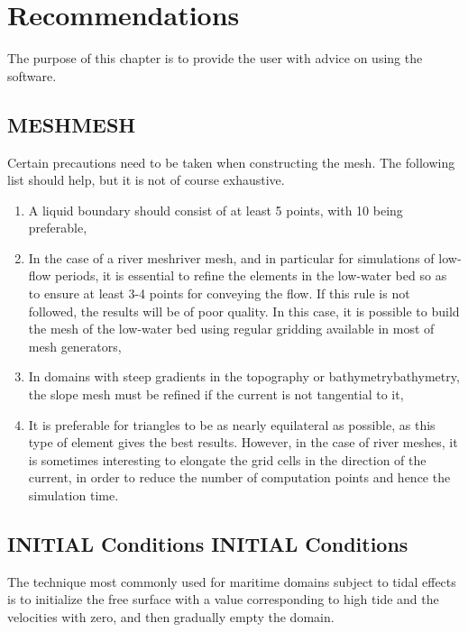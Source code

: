 \documentclass{article} %
\begin{document}
\section{  Recommendations}

 The purpose of this chapter is to provide the user with advice on using the software.


\subsection{ MESHMESH}

 Certain precautions need to be taken when constructing the mesh. The following list should help, but it is not of course exhaustive.

\begin{enumerate}
\item  A liquid boundary should consist of at least 5 points, with 10 being preferable,

\item  In the case of a river meshriver mesh, and in particular for simulations of low-flow periods, it is essential to refine the elements in the low-water bed so as to ensure at least 3-4 points for conveying the flow. If this rule is not followed, the results will be of poor quality. In this case, it is possible to build the mesh of the low-water bed using regular gridding available in most of mesh generators,

\item  In domains with steep gradients in the topography or bathymetrybathymetry, the slope mesh must be refined if the current is not tangential to it,

\item  It is preferable for triangles to be as nearly equilateral as possible, as this type of element gives the best results. However, in the case of river meshes, it is sometimes interesting to elongate the grid cells in the direction of the current, in order to reduce the number of computation points and hence the simulation time.
\end{enumerate}


\subsection{ INITIAL Conditions INITIAL Conditions}

 The technique most commonly used for maritime domains subject to tidal effects is to initialize the free surface with a value corresponding to high tide and the velocities with zero, and then gradually empty the domain.
\end{document}
